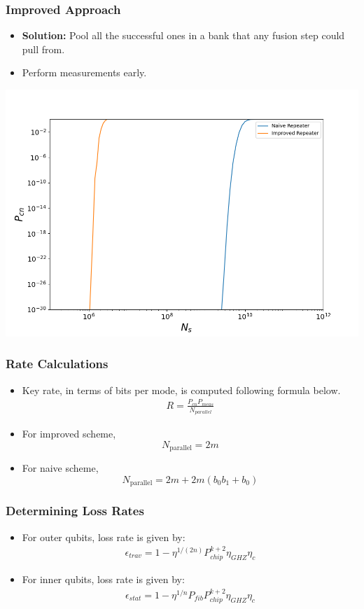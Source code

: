 \documentclass[aspectratio=169,xcolor=dvipsnames]{beamer}
\begin{document}
\begin{frame}
\frametitle{Improved Approach}
\begin{itemize}
    \item \textbf{Solution:} Pool all the successful ones in a bank that any fusion step could pull from.
    \item Perform measurements early.
\end{itemize}
\begin{center}
    \includegraphics[width=0.65\linewidth]{figs/p_graph.png}
\end{center}
\end{frame}

\begin{frame}
    \frametitle{Rate Calculations}
    \begin{itemize}
        \item Key rate, in terms of bits per mode, is computed following formula below.
        \begin{align*}
            R = \frac{P_{cn} P_{meas}}{N_{parallel}}
        \end{align*}
        \item For improved scheme,
        \begin{equation}
            N_\text{parallel} = 2m
        \end{equation}
        \item For naive scheme,
        \begin{equation}
            N_\text{parallel} = 2m + 2m(b_0b_1 + b_0)
        \end{equation}
    \end{itemize}
    \end{frame}
    
    \begin{frame}
    \frametitle{Determining Loss Rates}
    \begin{itemize}
        \item For outer qubits, loss rate is given by:
        \begin{align*}
            \epsilon_{trav} = 1 - \eta^{1/(2n)}P_{chip}^{k+2}\eta_{GHZ}\eta_c
        \end{align*}
        \item For inner qubits, loss rate is given by:
        \begin{align*}
            \epsilon_{stat} = 1 - \eta^{1/n}P_{fib}P_{chip}^{k+2}\eta_{GHZ}\eta_c
        \end{align*}
    \end{itemize}
    \end{frame}
    
\end{document}

